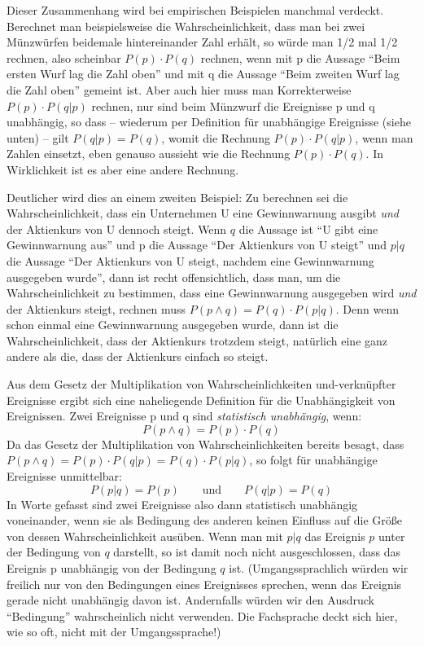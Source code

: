 Dieser Zusammenhang wird bei empirischen Beispielen manchmal verdeckt.
Berechnet man beispielsweise die Wahrscheinlichkeit, dass man bei zwei
Münzwürfen beidemale hintereinander Zahl erhält, so würde man 1/2 mal 1/2
rechnen, also scheinbar $P(p)\cdot P(q)$ rechnen, wenn mit p die Aussage
"`Beim ersten Wurf lag die Zahl oben"' und mit q die Aussage "`Beim zweiten
Wurf lag die Zahl oben"' gemeint ist. Aber auch hier muss man Korrekterweise
$P(p)\cdot P(q|p)$ rechnen, nur sind beim Münzwurf die Ereignisse p und q
unabhängig, so dass -- wiederum per Definition für unabhängige Ereignisse
(siehe unten) -- gilt $P(q|p) = P(q)$, womit die Rechnung 
$P(p)\cdot P(q|p)$, wenn man Zahlen einsetzt, eben genauso aussieht 
wie die Rechnung $P(p)\cdot P(q)$. In Wirklichkeit ist es aber eine andere
Rechnung.

Deutlicher wird dies an einem zweiten Beispiel: \label{AktienBeispiel} Zu
berechnen sei die Wahrscheinlichkeit, dass ein Unternehmen U eine Gewinnwarnung
ausgibt {\em und} der Aktienkurs von U dennoch steigt. Wenn $q$ die Aussage ist
"`U gibt eine Gewinnwarnung aus"' und p die Aussage "`Der Aktienkurs von U steigt"'
und $p|q$ die Aussage "`Der Aktienkurs von U steigt, nachdem eine Gewinnwarnung
ausgegeben wurde"', dann ist recht offensichtlich, dass man, um die
Wahrscheinlichkeit zu bestimmen, dass eine Gewinnwarnung ausgegeben wird {\em
und} der Aktienkurs steigt, rechnen muss $P(p \wedge q) = P(q)\cdot P(p|q)$.
Denn wenn schon einmal eine Gewinnwarnung ausgegeben wurde, dann ist die
Wahrscheinlichkeit, dass der Aktienkurs trotzdem steigt, natürlich eine ganz
andere als die, dass der Aktienkurs einfach so steigt.

Aus dem Gesetz der Multiplikation von Wahrscheinlichkeiten und-ver\-knüpf\-ter
Ereignisse ergibt sich eine naheliegende Definition für die Unabhängigkeit von
Ereignissen. Zwei Ereignisse p und q sind {\em statistisch unabhängig}, 
 wenn: \[
P(p \wedge q) = P(p)\cdot P(q) \] Da das Gesetz der Multiplikation von
Wahrscheinlichkeiten bereits besagt, dass $P(p \wedge q) = P(p)\cdot P(q|p) =
P(q)\cdot P(p|q)$, so folgt für unabhängige Ereignisse unmittelbar: \[ P(p|q) =
P(p) \qquad \mbox{und} \qquad P(q|p) = P(q) \] In Worte gefasst sind zwei
Ereignisse also dann statistisch unabhängig voneinander, wenn sie als Bedingung
des anderen keinen Einfluss auf die Größe von dessen Wahrscheinlichkeit ausüben.
Wenn man mit $p|q$ das Ereignis $p$ unter der Bedingung von $q$ darstellt, so
ist damit noch nicht ausgeschlossen, dass das Ereignis p unabhängig von der
Bedingung $q$ ist. (Umgangssprachlich würden wir freilich nur von den
Bedingungen eines Ereignisses sprechen, wenn das Ereignis gerade nicht unabhängig davon ist.
Andernfalls würden wir den Ausdruck "`Bedingung"' wahrscheinlich nicht verwenden.
Die Fachsprache deckt sich hier, wie so oft, nicht mit der Umgangssprache!)

